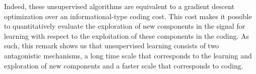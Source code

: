 \documentclass[a4paper, 11pt, draft]{article} %
\newcommand{\coef}{\mathbf{a}} %
\newcommand{\image}{\mathbf{I}} %
\newcommand{\dico}{\Phi} %
\begin{document}
Indeed, these unsupervised algorithms are equivalent to a gradient descent optimization over an informational-type
coding cost. This cost makes it possible to quantitatively evaluate the
exploration of new components in the signal for learning with respect to
the exploitation of these components in the coding. As such, this remark
shows us that unsupervised learning consists of two antagonistic
mechanisms, a long time scale that corresponds to the learning and
exploration of new components and a faster scale that corresponds to
coding.

\end{document}
